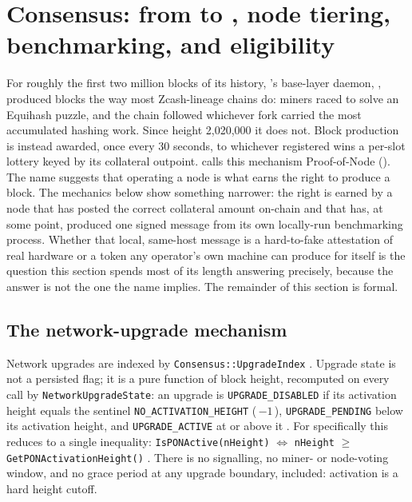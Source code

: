 \section{Consensus: from \PoW to \PoN, node tiering, benchmarking, and eligibility}
\label{sec:consensus}

For roughly the first two million blocks of its history, \Flux's base-layer daemon, \fluxd, produced
blocks the way most Zcash-lineage chains do: miners raced to solve an Equihash puzzle, and the chain
followed whichever fork carried the most accumulated hashing work. Since height 2{,}020{,}000 it does
not. Block production is instead awarded, once every 30 seconds, to whichever registered \FluxNode
wins a per-slot lottery keyed by its collateral outpoint. \Flux calls this mechanism Proof-of-Node
(\PoN). The name suggests that operating a node is what earns the right to produce a block. The
mechanics below show something narrower: the right is earned by a node that has posted the correct
collateral amount on-chain and that has, at some point, produced one signed message from its own
locally-run benchmarking process. Whether that local, same-host message is a hard-to-fake attestation
of real hardware or a token any operator's own machine can produce for itself is the question this
section spends most of its length answering precisely, because the answer is not the one the name
implies. The remainder of this section is formal.

\subsection{The network-upgrade mechanism}
\label{sec:consensus-upgrades}

Network upgrades are indexed by \texttt{Consensus::\allowbreak{}Upgrade\allowbreak{}Index}
\shipped {}. Upgrade state is not a persisted flag; it is
a pure function of block height, recomputed on every call by \texttt{Network\allowbreak{}Upgrade\allowbreak{}State}: an upgrade
is \texttt{UPGRADE\_DISABLED} if its activation height equals the sentinel
\texttt{NO\_ACTIVATION\_HEIGHT} (\,$-1$\,), \texttt{UPGRADE\_PENDING} below its activation height, and
\texttt{UPGRADE\_ACTIVE} at or above it \shipped {}.
For \PoN specifically this reduces to a single inequality:
\texttt{Is\allowbreak{}PONActive(n\allowbreak{}Height)} $\Leftrightarrow$ \texttt{nHeight} $\ge$ \texttt{Get\allowbreak{}PONActivation\allowbreak{}Height()}
\shipped {}. There is no signalling, no
miner- or node-voting window, and no grace period at any upgrade boundary, \PoN included: activation
is a hard height cutoff.


